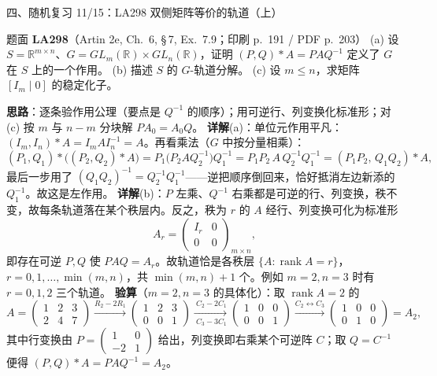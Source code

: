 \documentclass[aspectratio=169,10pt,fontset=none]{ctexbeamer}
\newcommand{\ex}[1]{\textcolor{accent}{\footnotesize\bfseries #1}}
\newcommand{\key}[1]{\textcolor{ink}{\bfseries #1}}
\begin{document}
\begin{frame}[t]{四、随机复习 11/15：LA298 双侧矩阵等价的轨道（上）}
\label{ex:LA298}
\scriptsize
\begin{block}{\footnotesize 题面 \ex{LA298}（Artin 2e, Ch.~6, \S\,7, Ex.~7.9；印刷 p.~191 / PDF p.~203）}
(a) 设 $S=\mathbb R^{m\times n}$、$G=GL_m(\mathbb R)\times GL_n(\mathbb R)$，证明 $(P,Q)*A=PAQ^{-1}$ 定义了 $G$ 在 $S$ 上的一个作用。\quad
(b) 描述 $S$ 的 $G$-轨道分解。\quad
(c) 设 $m\le n$，求矩阵 $[I_m\mid 0]$ 的稳定化子。
\end{block}
\key{思路}：逐条验作用公理（要点是 $Q^{-1}$ 的顺序）；用可逆行、列变换化标准形；对 (c) 按 $m$ 与 $n-m$ 分块解 $PA_0=A_0Q$。
\key{详解}(a)：单位元作用平凡：$(I_m,I_n)*A=I_mAI_n^{-1}=A$。再看乘法（$G$ 中按分量相乘）：
\[
(P_1,Q_1)*\big((P_2,Q_2)*A\big)=P_1\big(P_2AQ_2^{-1}\big)Q_1^{-1}
=P_1P_2\,A\,Q_2^{-1}Q_1^{-1}=(P_1P_2,\,Q_1Q_2)*A,
\]
最后一步用了 $(Q_1Q_2)^{-1}=Q_2^{-1}Q_1^{-1}$——逆把顺序倒回来，恰好抵消左边新添的 $Q_1^{-1}$。故这是左作用。
\key{详解}(b)：$P$ 左乘、$Q^{-1}$ 右乘都是可逆的行、列变换，秩不变，故每条轨道落在某个秩层内。反之，秩为 $r$ 的 $A$ 经行、列变换可化为标准形
\[ A_r=\begin{pmatrix}I_r&0\\0&0\end{pmatrix}_{m\times n}, \]
即存在可逆 $P,Q$ 使 $PAQ=A_r$。故轨道恰是各秩层 $\{A:\operatorname{rank}A=r\}$，$r=0,1,\dots,\min(m,n)$，共 $\min(m,n)+1$ 个。例如 $m=2,n=3$ 时有 $r=0,1,2$ 三个轨道。
\key{验算}（$m=2,n=3$ 的具体化）：取 $\operatorname{rank}A=2$ 的
\[
A=\begin{pmatrix}1&2&3\\2&4&7\end{pmatrix}
\xrightarrow{R_2-2R_1}\begin{pmatrix}1&2&3\\0&0&1\end{pmatrix}
\xrightarrow[\ C_3-3C_1]{\ C_2-2C_1}\begin{pmatrix}1&0&0\\0&0&1\end{pmatrix}
\xrightarrow{C_2\leftrightarrow C_3}\begin{pmatrix}1&0&0\\0&1&0\end{pmatrix}=A_2,
\]
其中行变换由 $P=\begin{pmatrix}1&0\\-2&1\end{pmatrix}$ 给出，列变换即右乘某个可逆阵 $C$；取 $Q=C^{-1}$ 便得 $(P,Q)*A=PAQ^{-1}=A_2$。
\end{frame}
\end{document}
